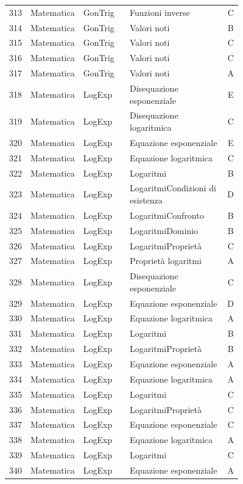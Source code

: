 \documentclass[20pt, a4paper]{article}
\begin{document}
\begin{longtable}{@{}r>{\raggedright\arraybackslash}p{0.14\linewidth}>{\raggedright\arraybackslash}p{0.20\linewidth}>{\raggedright\arraybackslash}p{0.42\linewidth}c@{}}
313 & Matematica & GonTrig & Funzioni inverse & C \\
314 & Matematica & GonTrig & Valori noti & B \\
315 & Matematica & GonTrig & Valori noti & C \\
316 & Matematica & GonTrig & Valori noti & C \\
317 & Matematica & GonTrig & Valori noti & A \\
318 & Matematica & LogExp & Disequazione esponenziale & E \\
319 & Matematica & LogExp & Disequazione logaritmica & C \\
320 & Matematica & LogExp & Equazione esponenziale & E \\
321 & Matematica & LogExp & Equazione logaritmica & C \\
322 & Matematica & LogExp & Logaritmi & B \\
323 & Matematica & LogExp & LogaritmiCondizioni di esistenza & D \\
324 & Matematica & LogExp & LogaritmiConfronto & B \\
325 & Matematica & LogExp & LogaritmiDominio & B \\
326 & Matematica & LogExp & LogaritmiProprietà & C \\
327 & Matematica & LogExp & Proprietà logaritmi & A \\
328 & Matematica & LogExp & Disequazione esponenziale & C \\
329 & Matematica & LogExp & Equazione esponenziale & D \\
330 & Matematica & LogExp & Equazione logaritmica & A \\
331 & Matematica & LogExp & Logaritmi & B \\
332 & Matematica & LogExp & LogaritmiProprietà & B \\
333 & Matematica & LogExp & Equazione esponenziale & A \\
334 & Matematica & LogExp & Equazione logaritmica & A \\
335 & Matematica & LogExp & Logaritmi & C \\
336 & Matematica & LogExp & LogaritmiProprietà & C \\
337 & Matematica & LogExp & Equazione esponenziale & C \\
338 & Matematica & LogExp & Equazione logaritmica & A \\
339 & Matematica & LogExp & Logaritmi & C \\
340 & Matematica & LogExp & Equazione esponenziale & A \\

\end{longtable}
\end{document}
